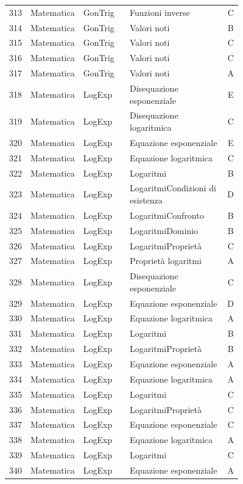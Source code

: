 \documentclass[20pt, a4paper]{article}
\begin{document}
\begin{longtable}{@{}r>{\raggedright\arraybackslash}p{0.14\linewidth}>{\raggedright\arraybackslash}p{0.20\linewidth}>{\raggedright\arraybackslash}p{0.42\linewidth}c@{}}
313 & Matematica & GonTrig & Funzioni inverse & C \\
314 & Matematica & GonTrig & Valori noti & B \\
315 & Matematica & GonTrig & Valori noti & C \\
316 & Matematica & GonTrig & Valori noti & C \\
317 & Matematica & GonTrig & Valori noti & A \\
318 & Matematica & LogExp & Disequazione esponenziale & E \\
319 & Matematica & LogExp & Disequazione logaritmica & C \\
320 & Matematica & LogExp & Equazione esponenziale & E \\
321 & Matematica & LogExp & Equazione logaritmica & C \\
322 & Matematica & LogExp & Logaritmi & B \\
323 & Matematica & LogExp & LogaritmiCondizioni di esistenza & D \\
324 & Matematica & LogExp & LogaritmiConfronto & B \\
325 & Matematica & LogExp & LogaritmiDominio & B \\
326 & Matematica & LogExp & LogaritmiProprietà & C \\
327 & Matematica & LogExp & Proprietà logaritmi & A \\
328 & Matematica & LogExp & Disequazione esponenziale & C \\
329 & Matematica & LogExp & Equazione esponenziale & D \\
330 & Matematica & LogExp & Equazione logaritmica & A \\
331 & Matematica & LogExp & Logaritmi & B \\
332 & Matematica & LogExp & LogaritmiProprietà & B \\
333 & Matematica & LogExp & Equazione esponenziale & A \\
334 & Matematica & LogExp & Equazione logaritmica & A \\
335 & Matematica & LogExp & Logaritmi & C \\
336 & Matematica & LogExp & LogaritmiProprietà & C \\
337 & Matematica & LogExp & Equazione esponenziale & C \\
338 & Matematica & LogExp & Equazione logaritmica & A \\
339 & Matematica & LogExp & Logaritmi & C \\
340 & Matematica & LogExp & Equazione esponenziale & A \\

\end{longtable}
\end{document}
